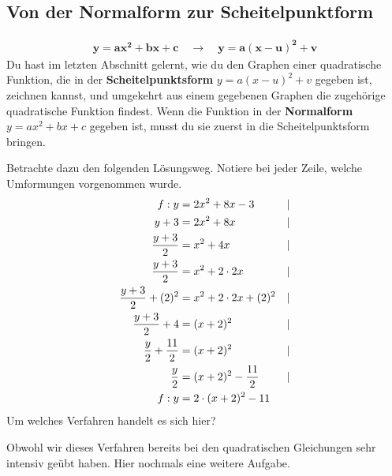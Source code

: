 \documentclass[11pt,oneside]{article}
\begin{document}
\subsection{Von der Normalform zur Scheitelpunktform}
	\begin{align*}
		\mathbf{y=ax^2+bx+c \quad \longrightarrow \quad y=a(x-u)^2+v}
	\end{align*}
	Du hast im letzten Abschnitt gelernt, wie du den Graphen einer quadratische Funktion, die in der \textbf{Scheitelpunktsform} $y=a(x-u)^2+v$ gegeben ist, zeichnen kannst, und umgekehrt aus einem gegebenen Graphen die zugehörige quadratische Funktion findest. Wenn die Funktion in der \textbf{Normalform} $y=ax^2+bx+c$ gegeben ist, musst du sie zuerst in die Scheitelpunktsform bringen.
	\begin{aufgabe}
		Betrachte dazu den folgenden Lösungsweg. Notiere bei jeder Zeile, welche Umformungen vorgenommen wurde.
		\begin{align*}
			f:y&=2x^2+8x-3 &&\vert \\
			y+3&=2x^2+8x &&\vert \\
			\frac{y+3}{2}&=x^2+4x &&\vert \\
			\frac{y+3}{2}&=x^2+2\cdot2x &&\vert \\
			\frac{y+3}{2}+(2)^2&=x^2+2\cdot2x+(2)^2 &&\vert \\
			\frac{y+3}{2}+4&=(x+2)^2 &&\vert \\
			\frac{y}{2}+\frac{11}{2}&=(x+2)^2 &&\vert \\
			\frac{y}{2}&=(x+2)^2-\frac{11}{2} &&\vert \\
			f:y&=2\cdot(x+2)^2-11
		\end{align*}
		Um welches Verfahren handelt es sich hier? 
	\end{aufgabe}
	Obwohl wir dieses Verfahren bereits bei den quadratischen Gleichungen sehr intensiv geübt haben. Hier nochmals eine weitere Aufgabe.
\end{document}
